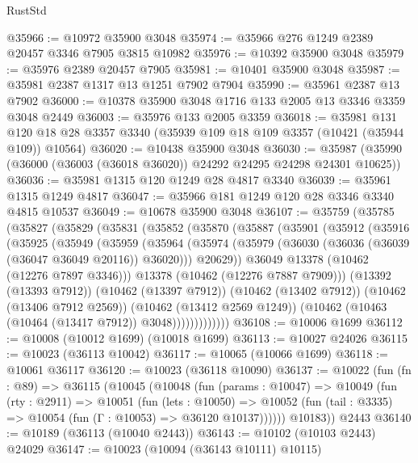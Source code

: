 \begin{lexlean}{RustStd}
\begin{coremodule}
@35966 := @10972 @35900 @3048
@35974 := @35966 @276 @1249 @2389 @20457 @3346 @7905 @3815 @10982
@35976 := @10392 @35900 @3048
@35979 := @35976 @2389 @20457 @7905
@35981 := @10401 @35900 @3048
@35987 := @35981 @2387 @1317 @13 @1251 @7902 @7904
@35990 := @35961 @2387 @13 @7902
@36000 := @10378 @35900 @3048 @1716 @133 @2005 @13 @3346 @3359 @3048 @2449
@36003 := @35976 @133 @2005 @3359
@36018 := @35981
    @131
    @120
    @18
    @28
    @3357
    @3340
    (@35939 @109 @18 @109 @3357 (@10421 (@35944 @109)) @10564)
@36020 := @10438 @35900 @3048
@36030 := @35987 (@35990 (@36000 (@36003 (@36018 @36020)) @24292 @24295 @24298 @24301 @10625))
@36036 := @35981 @1315 @120 @1249 @28 @4817 @3340
@36039 := @35961 @1315 @1249 @4817
@36047 := @35966 @181 @1249 @120 @28 @3346 @3340 @4815 @10537
@36049 := @10678 @35900 @3048
@36107 := @35759
    (@35785
      (@35827
        (@35829
          (@35831
            (@35852
              (@35870
                (@35887
                  (@35901
                    (@35912
                      (@35916
                        (@35925
                          (@35949
                            (@35959
                              (@35964
                                (@35974
                                  (@35979 (@36030 (@36036 (@36039 (@36047 @36049 @20116)) @36020)))
                                  @20629))
                              @36049
                              @13378
                              (@10462 (@12276 @7897 @3346)))
                            @13378
                            (@10462 (@12276 @7887 @7909)))
                          (@13392 (@13393 @7912))
                          (@10462 (@13397 @7912))
                          (@10462 (@13402 @7912))
                          (@10462 (@13406 @7912 @2569))
                          (@10462 (@13412 @2569 @1249))
                          (@10462 (@10463 (@10464 (@13417 @7912)) @3048)))))))))))))
@36108 := @10006 @1699
@36112 := @10008 (@10012 @1699) (@10018 @1699)
@36113 := @10027 @24026
@36115 := @10023 (@36113 @10042)
@36117 := @10065 (@10066 @1699)
@36118 := @10061 @36117
@36120 := @10023 (@36118 @10090)
@36137 := @10022
    (fun (fn : @89) =>
    @36115
      (@10045
        (@10048
          (fun (params : @10047) =>
          @10049
            (fun (rty : @2911) =>
            @10051
              (fun (lets : @10050) =>
              @10052 (fun (tail : @3335) => @10054 (fun (Γ : @10053) => @36120 @10137))))))
        @10183))
    @2443
@36140 := @10189 (@36113 (@10040 @2443))
@36143 := @10102 (@10103 @2443) @24029
@36147 := @10023 (@10094 (@36143 @10111) @10115)

\end{coremodule}
\end{lexlean}
